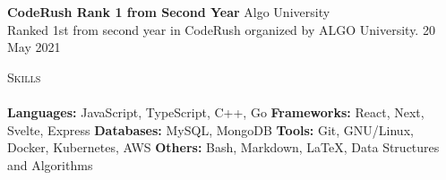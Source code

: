 \documentclass[a4paper]{article}
\newcommand{\lineunder} {
    \vspace*{-8pt} \\
    \hspace*{-18pt} \hrulefill \\
}
\newcommand{\header} [1] {
    {\hspace*{-18pt}\vspace*{6pt} \textsc{#1}}
    \vspace*{-6pt} \lineunder
}
\begin{document}

\textbf{CodeRush Rank 1 from Second Year} \hfill Algo University\\
Ranked 1st from second year in CodeRush organized by ALGO University. \hfill 20 May 2021\\
\vspace*{1.5mm}



\header{Skills}
\vspace{1mm}
\textbf{Languages:} JavaScript, TypeScript, C++, Go
\quad \textbf{Frameworks:} React, Next, Svelte, Express
\quad \textbf{Databases:} MySQL, MongoDB
\quad \textbf{Tools:} Git, GNU/Linux, Docker, Kubernetes, AWS
\quad \textbf{Others:} Bash, Markdown, \LaTeX, Data Structures and Algorithms
\vspace{1.5mm}
\end{document}
